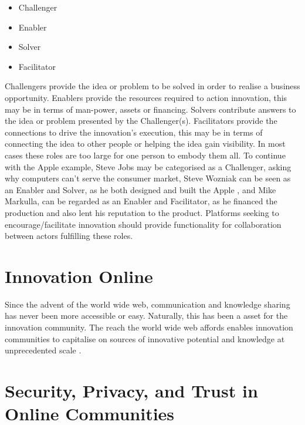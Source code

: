 \begin{itemize}
	\item Challenger
	\item Enabler
	\item Solver
	\item Facilitator
\end{itemize}

Challengers provide the idea or problem to be solved in order to realise a business opportunity. Enablers provide the resources required to action innovation, this may be in terms of man-power, assets or financing. Solvers contribute answers to the idea or problem presented by the Challenger(s). Facilitators provide the connections to drive the innovation's execution, this may be in terms of connecting the idea to other people or helping the idea gain visibility. In most cases these roles are too large for one person to embody them all. To continue with the Apple  example, Steve Jobs may be categorised as a Challenger, asking why computers can't serve the consumer market, Steve Wozniak can be seen as an Enabler and Solver, as he both designed and built the Apple , and Mike Markulla, can be regarded as an Enabler and Facilitator, as he financed the production and also lent his reputation to the product. Platforms seeking to encourage/facilitate innovation should provide functionality for collaboration between actors fulfilling these roles.

\section{Innovation Online}
Since the advent of the world wide web, communication and knowledge sharing has never been more accessible or easy. Naturally, this has been a asset for the innovation community. The reach the world wide web affords enables innovation communities to capitalise on sources of innovative potential and knowledge at unprecedented scale \cite{hautz2010establish}.

\section{Security, Privacy, and Trust in Online Communities}

